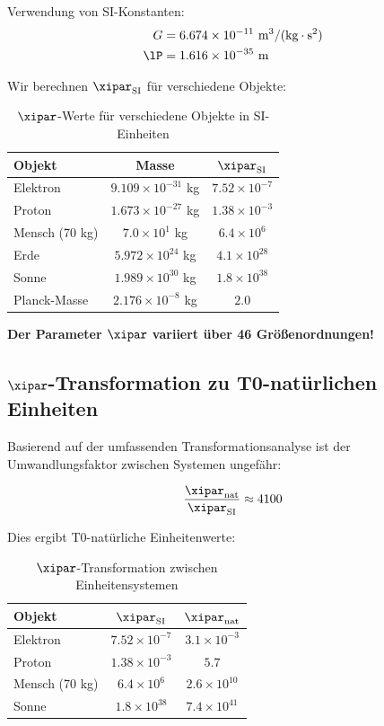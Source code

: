 	Verwendung von SI-Konstanten:
	\begin{align}
		G &= 6.674 \times 10^{-11} \text{ m}^3/(\text{kg} \cdot \text{s}^2) \\
		\lP &= 1.616 \times 10^{-35} \text{ m}
	\end{align}
	
	Wir berechnen $\xipar_{\text{SI}}$ für verschiedene Objekte:
	
	\begin{table}[htbp]
		\centering
		\begin{tabular}{lcc}
			\toprule
			\textbf{Objekt} & \textbf{Masse} & \textbf{$\xipar_{\text{SI}}$} \\
			\midrule
			Elektron & $9.109 \times 10^{-31}$ kg & $7.52 \times 10^{-7}$ \\
			Proton & $1.673 \times 10^{-27}$ kg & $1.38 \times 10^{-3}$ \\
			Mensch (70 kg) & $7.0 \times 10^{1}$ kg & $6.4 \times 10^{6}$ \\
			Erde & $5.972 \times 10^{24}$ kg & $4.1 \times 10^{28}$ \\
			Sonne & $1.989 \times 10^{30}$ kg & $1.8 \times 10^{38}$ \\
			Planck-Masse & $2.176 \times 10^{-8}$ kg & $2.0$ \\
			\bottomrule
		\end{tabular}
		\caption{$\xipar$-Werte für verschiedene Objekte in SI-Einheiten}
		\label{tab:xi_si_werte}
	\end{table}
	
	\textbf{Der Parameter $\xipar$ variiert über 46 Größenordnungen!}
	
	\subsection{$\xipar$-Transformation zu T0-natürlichen Einheiten}
	\label{subsec:xi_transformation}
	
	Basierend auf der umfassenden Transformationsanalyse ist der Umwandlungsfaktor zwischen Systemen ungefähr:
	
	$$\frac{\xipar_{\text{nat}}}{\xipar_{\text{SI}}} \approx 4100$$
	
	Dies ergibt T0-natürliche Einheitenwerte:
	
	\begin{table}[htbp]
		\centering
		\begin{tabular}{lcc}
			\toprule
			\textbf{Objekt} & \textbf{$\xipar_{\text{SI}}$} & \textbf{$\xipar_{\text{nat}}$} \\
			\midrule
			Elektron & $7.52 \times 10^{-7}$ & $3.1 \times 10^{-3}$ \\
			Proton & $1.38 \times 10^{-3}$ & $5.7$ \\
			Mensch (70 kg) & $6.4 \times 10^{6}$ & $2.6 \times 10^{10}$ \\
			Sonne & $1.8 \times 10^{38}$ & $7.4 \times 10^{41}$ \\
			\bottomrule
		\end{tabular}
		\caption{$\xipar$-Transformation zwischen Einheitensystemen}
		\label{tab:xi_transformation}
	\end{table}
	

